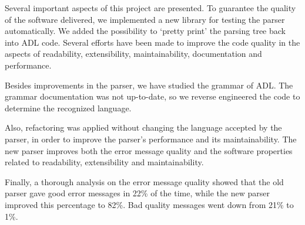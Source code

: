 Several  important aspects of this project are presented.
To guarantee the quality of the software delivered, we implemented a new library for testing the parser automatically.
We added the possibility to `pretty print' the parsing tree back into ADL code.
Several efforts have been made to improve the code quality in the aspects of readability, extensibility, maintainability, documentation and performance.

Besides improvements in the parser, we have studied the grammar of ADL.
The grammar documentation was not up-to-date, so we reverse engineered the code to determine the recognized language.

Also, refactoring was applied without changing the language accepted by the parser, in order to improve the parser's performance and its maintainability.
The new parser improves both the error message quality and the software properties related to readability, extensibility and maintainability.

Finally, a thorough analysis on the error message quality showed that the old parser gave good error messages in 22\% of the time, while the new parser improved this percentage to 82\%.
Bad quality messages went down from 21\% to 1\%.
